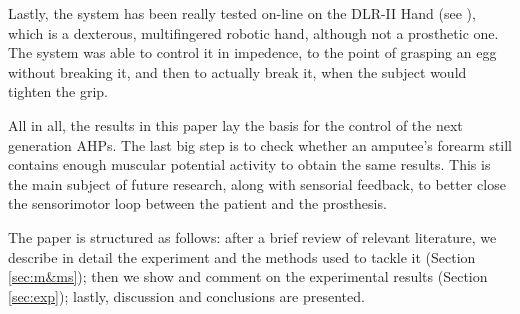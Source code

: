 Lastly, the system has been really tested on-line on the DLR-II Hand
(see \cite{ButFisGre2004}), which is a dexterous, multifingered
robotic hand, although not a prosthetic one. The system was able to
control it in impedence, to the point of grasping an egg without
breaking it, and then to actually break it, when the subject would
tighten the grip.

All in all, the results in this paper lay the basis for the control of
the next generation AHPs. The last big step is to check whether an
amputee's forearm still contains enough muscular potential activity to
obtain the same results. This is the main subject of future research,
along with sensorial feedback, to better close the sensorimotor loop
between the patient and the prosthesis.

The paper is structured as follows: after a brief review of relevant
literature, we describe in detail the experiment and the methods used
to tackle it (Section \ref{sec:m&ms}); then we show and comment on the
experimental results (Section \ref{sec:exp}); lastly, discussion and
conclusions are presented.

